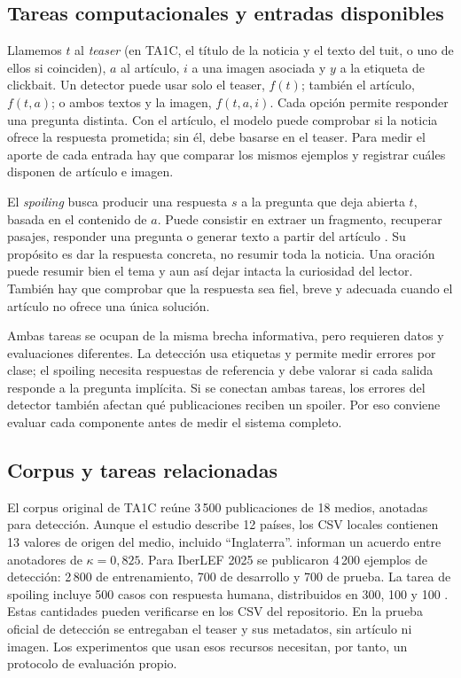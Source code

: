 \subsection{Tareas computacionales y entradas disponibles}
\label{sec:tareas}

Llamemos $t$ al \emph{teaser} (en TA1C, el título de la noticia y el texto del tuit, o uno de ellos si coinciden), $a$ al artículo, $i$ a una imagen asociada y $y$ a la etiqueta de clickbait. Un detector puede usar solo el teaser, $f(t)$; también el artículo, $f(t,a)$; o ambos textos y la imagen, $f(t,a,i)$. Cada opción permite responder una pregunta distinta. Con el artículo, el modelo puede comprobar si la noticia ofrece la respuesta prometida; sin él, debe basarse en el teaser. Para medir el aporte de cada entrada hay que comparar los mismos ejemplos y registrar cuáles disponen de artículo e imagen.

El \emph{spoiling} busca producir una respuesta $s$ a la pregunta que deja abierta $t$, basada en el contenido de $a$. Puede consistir en extraer un fragmento, recuperar pasajes, responder una pregunta o generar texto a partir del artículo \citep{hagen2022,frobe2023}. Su propósito es dar la respuesta concreta, no resumir toda la noticia. Una oración puede resumir bien el tema y aun así dejar intacta la curiosidad del lector. También hay que comprobar que la respuesta sea fiel, breve y adecuada cuando el artículo no ofrece una única solución.

Ambas tareas se ocupan de la misma brecha informativa, pero requieren datos y evaluaciones diferentes. La detección usa etiquetas y permite medir errores por clase; el spoiling necesita respuestas de referencia y debe valorar si cada salida responde a la pregunta implícita. Si se conectan ambas tareas, los errores del detector también afectan qué publicaciones reciben un spoiler. Por eso conviene evaluar cada componente antes de medir el sistema completo.

\subsection{Corpus y tareas relacionadas}
\label{sec:corpus}

El corpus original de TA1C reúne 3\,500 publicaciones de 18 medios, anotadas para detección. Aunque el estudio describe 12 países, los CSV locales contienen 13 valores de origen del medio, incluido ``Inglaterra''. \citet{mordecki2025} informan un acuerdo entre anotadores de $\kappa=0{,}825$. Para IberLEF 2025 se publicaron 4\,200 ejemplos de detección: 2\,800 de entrenamiento, 700 de desarrollo y 700 de prueba. La tarea de spoiling incluye 500 casos con respuesta humana, distribuidos en 300, 100 y 100 \citep{ta1c2025}. Estas cantidades pueden verificarse en los CSV del repositorio. En la prueba oficial de detección se entregaban el teaser y sus metadatos, sin artículo ni imagen. Los experimentos que usan esos recursos necesitan, por tanto, un protocolo de evaluación propio.

